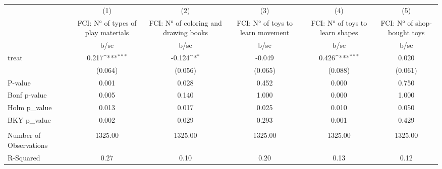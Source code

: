 {
\def\sym#1{\ifmmode^{#1}\else\(^{#1}\)\fi}
\begin{tabular}{l*{5}{c}}
\hline\hline
                    &\multicolumn{1}{c}{(1)}&\multicolumn{1}{c}{(2)}&\multicolumn{1}{c}{(3)}&\multicolumn{1}{c}{(4)}&\multicolumn{1}{c}{(5)}\\
                    &\multicolumn{1}{c}{FCI: N° of types of play materials}&\multicolumn{1}{c}{FCI: N° of coloring and drawing books}&\multicolumn{1}{c}{FCI: N° of toys to learn movement}&\multicolumn{1}{c}{FCI: N° of toys to learn shapes}&\multicolumn{1}{c}{FCI: N° of shop-bought toys}\\
                    &        b/se         &        b/se         &        b/se         &        b/se         &        b/se         \\
\hline
treat               &       0.217\sym{***}&      -0.124\sym{*}  &      -0.049         &       0.426\sym{***}&       0.020         \\
                    &     (0.064)         &     (0.056)         &     (0.065)         &     (0.088)         &     (0.061)         \\
\hline
P-value             &       0.001         &       0.028         &       0.452         &       0.000         &       0.750         \\
Bonf p-value        &       0.005         &       0.140         &       1.000         &       0.000         &       1.000         \\
Holm p\_value        &       0.013         &       0.017         &       0.025         &       0.010         &       0.050         \\
BKY p\_value         &       0.002         &       0.029         &       0.293         &       0.001         &       0.429         \\
                    &                     &                     &                     &                     &                     \\
Number of Observations&     1325.00         &     1325.00         &     1325.00         &     1325.00         &     1325.00         \\
R-Squared           &        0.27         &        0.10         &        0.20         &        0.13         &        0.12         \\
\hline\hline
\end{tabular}
}
